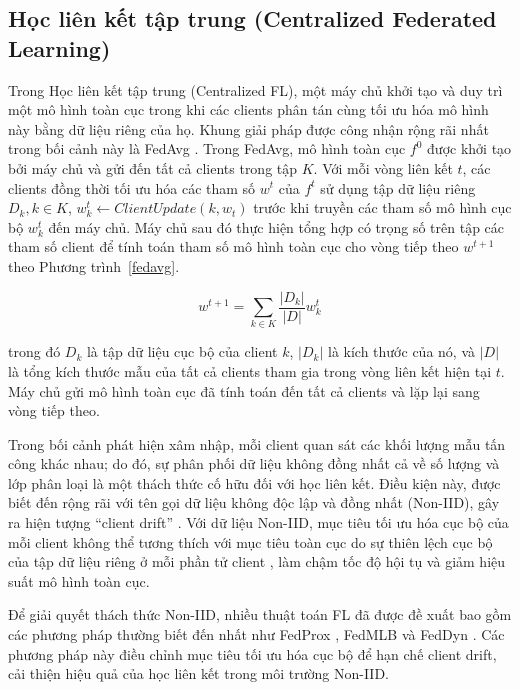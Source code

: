 \subsection{Học liên kết tập trung (Centralized Federated Learning)}
Trong Học liên kết tập trung (Centralized FL), một máy chủ khởi tạo và duy trì một mô hình toàn cục trong khi các clients phân tán cùng tối ưu hóa mô hình này bằng dữ liệu riêng của họ. Khung giải pháp được công nhận rộng rãi nhất trong bối cảnh này là FedAvg \cite{fedavg}. Trong FedAvg, mô hình toàn cục $f^0$ được khởi tạo bởi máy chủ và gửi đến tất cả clients trong tập $K$. Với mỗi vòng liên kết $t$, các clients đồng thời tối ưu hóa các tham số $w^t$ của $f^t$ sử dụng tập dữ liệu riêng $D_k, k\in K$, $w_k^t \leftarrow ClientUpdate(k, w_t)$ trước khi truyền các tham số mô hình cục bộ $w_k^t$ đến máy chủ. Máy chủ sau đó thực hiện tổng hợp có trọng số trên tập các tham số client để tính toán tham số mô hình toàn cục cho vòng tiếp theo $w^{t+1}$ theo Phương trình~\ref{fedavg}.

\begin{equation}
\label{fedavg}
w^{t+1} = \sum_{k \in K}\frac{|D_k|}{|D|}w_k^t
\end{equation}

trong đó $D_k$ là tập dữ liệu cục bộ của client $k$, $|D_k|$ là kích thước của nó, và $|D|$ là tổng kích thước mẫu của tất cả clients tham gia trong vòng liên kết hiện tại $t$. Máy chủ gửi mô hình toàn cục đã tính toán đến tất cả clients và lặp lại sang vòng tiếp theo.

Trong bối cảnh phát hiện xâm nhập, mỗi client quan sát các khối lượng mẫu tấn công khác nhau; do đó, sự phân phối dữ liệu không đồng nhất cả về số lượng và lớp phân loại là một thách thức cố hữu đối với học liên kết. Điều kiện này, được biết đến rộng rãi với tên gọi dữ liệu không độc lập và đồng nhất (Non-IID), gây ra hiện tượng ``client drift'' \cite{he2022fedssd}. Với dữ liệu Non-IID, mục tiêu tối ưu hóa cục bộ của mỗi client không thể tương thích với mục tiêu toàn cục do sự thiên lệch cục bộ của tập dữ liệu riêng ở mỗi phần tử client \cite{acar2021feddyn}, làm chậm tốc độ hội tụ và giảm hiệu suất mô hình toàn cục.

Để giải quyết thách thức Non-IID, nhiều thuật toán FL đã được đề xuất bao gồm các phương pháp thường biết đến nhất như FedProx \cite{li2020fedprox}, FedMLB \cite{kim2022fedmlb} và FedDyn \cite{acar2021feddyn}. Các phương pháp này điều chỉnh mục tiêu tối ưu hóa cục bộ để hạn chế client drift, cải thiện hiệu quả của học liên kết trong môi trường Non-IID.

